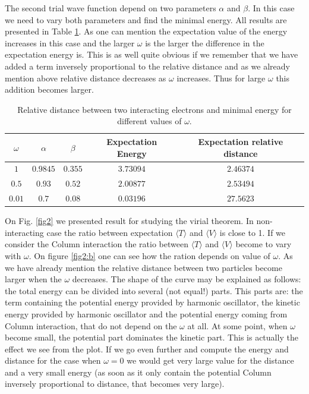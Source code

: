 \documentclass[10pt]{article}
\begin{document}
The second trial wave function depend on two parameters $\alpha$ and $\beta$. In this case we need to vary both parameters and find the minimal energy. All results are presented in Table \ref{tab:two}. As one can mention the expectation value of the energy increases in this case and the larger $\omega$ is the larger the difference in the expectation energy is. This is as well quite obvious if we remember that we have added a term inversely proportional to the relative distance and as we already mention above relative distance decreases as $\omega$ increases. Thus for large $\omega$ this addition becomes larger.
 
\begin{table}[h!]
  \caption{Relative distance between two interacting electrons and minimal energy for different values of $\omega$.}
  \label{tab:two}
  \begin{center}
    \begin{tabular}{c|c|c|c|c}
    \hline
		$\omega$ & $\alpha$& $\beta$ & Expectation Energy & Expectation relative distance \\
    \hline
	$	1 $  & $0.9845$& $0.355$ & $3.73094$ & $2.46374$  \\
	$	0.5$  & $0.93$ & $0.52$ & $2.00877$ & $2.53494$   \\
	$	0.01$  & $0.7$ & $0.08$ & $0.03196$ & $27.5623$   \\
	\end{tabular}
  \end{center}
\end{table}


On Fig. \ref{fig2} we presented result for studying the virial theorem. In non-interacting case the ratio between expectation  $\langle T \rangle$  and   $\langle V \rangle$ is close to 1. If we consider the Column interaction the ratio between  $\langle T \rangle$  and   $\langle V \rangle$ become to vary with $\omega$. On figure \ref{fig2:b} one can see how the ration depends on value of $\omega$. As we have already mention the relative distance between two particles become larger when the $\omega$ decreases. The shape of the curve may be explained as follows: the total energy can be divided into several (not equal!) parts. This parts are: the term containing the potential energy provided by harmonic oscillator, the kinetic energy provided by harmonic oscillator and the potential energy coming from Column interaction, that do not depend on the $\omega$ at all. At some point, when $\omega$ become small, the potential part dominates the kinetic part. This is actually the effect we see from the plot. If we go even further and compute the energy and distance for the case when $\omega =0$ we would get very large value for the distance and a very small energy (as soon as it only contain the potential Column inversely proportional to distance, that becomes very large).
\end{document}
